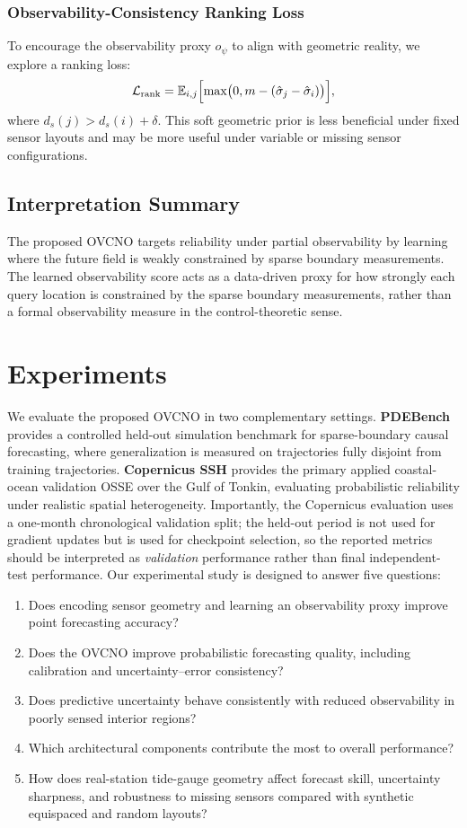 \documentclass[11pt,a4paper]{article}
\begin{document}
\subsubsection{Observability-Consistency Ranking Loss}
To encourage the observability proxy $o_\psi$ to align with geometric reality, we explore a ranking loss:
\begin{equation}
\mathcal{L}_{\mathrm{rank}} = \mathbb{E}_{i, j}\Bigl[ \max\bigl(0, m - (\hat{\sigma}_j - \hat{\sigma}_i)\bigr) \Bigr],
\end{equation}
where $d_s(j) > d_s(i) + \delta$. This soft geometric prior is less beneficial under fixed sensor layouts and may be more useful under variable or missing sensor configurations.

\subsection{Interpretation Summary}
The proposed OVCNO targets reliability under partial observability by learning where the future field is weakly constrained by sparse boundary measurements. The learned observability score acts as a data-driven proxy for how strongly each query location is constrained by the sparse boundary measurements, rather than a formal observability measure in the control-theoretic sense.
\section{Experiments}
\label{sec:experiments}

We evaluate the proposed OVCNO in two complementary settings. \textbf{PDEBench} provides a controlled held-out simulation benchmark for sparse-boundary causal forecasting, where generalization is measured on trajectories fully disjoint from training trajectories. \textbf{Copernicus SSH} provides the primary applied coastal-ocean validation OSSE over the Gulf of Tonkin, evaluating probabilistic reliability under realistic spatial heterogeneity. Importantly, the Copernicus evaluation uses a one-month chronological validation split; the held-out period is not used for gradient updates but is used for checkpoint selection, so the reported metrics should be interpreted as \emph{validation} performance rather than final independent-test performance. Our experimental study is designed to answer five questions:
\begin{enumerate}
    \item Does encoding sensor geometry and learning an observability proxy improve point forecasting accuracy?
    \item Does the OVCNO improve probabilistic forecasting quality, including calibration and uncertainty--error consistency?
    \item Does predictive uncertainty behave consistently with reduced observability in poorly sensed interior regions?
    \item Which architectural components contribute the most to overall performance?
    \item How does real-station tide-gauge geometry affect forecast skill, uncertainty sharpness, and robustness to missing sensors compared with synthetic equispaced and random layouts?
\end{enumerate}
\end{document}
